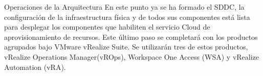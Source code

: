 \begin{subsection}{Operaciones de la Arquitectura}
    En este punto ya se ha formado el SDDC, la configuración de la infraestructura física y de todos sus componentes está lista para desplegar los componentes que habiliten el servicio Cloud de aprovisionamiento de recursos. Este último paso se completará con los productos agrupados bajo VMware vRealize Suite. Se utilizarán tres de estos productos, vRealize Operations Manager(vROps), Workspace One Access (WSA) y vRealize Automation (vRA).

\end{subsection}
